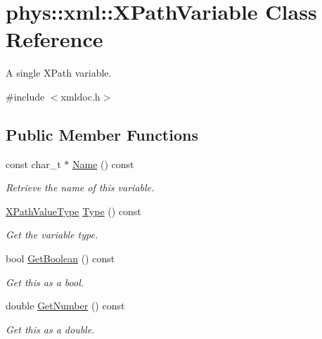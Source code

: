 \hypertarget{classphys_1_1xml_1_1XPathVariable}{
\section{phys::xml::XPathVariable Class Reference}
\label{df/dee/classphys_1_1xml_1_1XPathVariable}
}


A single XPath variable.  




{\ttfamily \#include $<$xmldoc.h$>$}

\subsection*{Public Member Functions}
\begin{DoxyCompactItemize}
\item 
const char\_\-t $\ast$ \hyperlink{classphys_1_1xml_1_1XPathVariable_af51c0a3362e130e30df85068ab95de63}{Name} () const 
\begin{DoxyCompactList}\small\item\em Retrieve the name of this variable. \item\end{DoxyCompactList}\item 
\hyperlink{namespacephys_1_1xml_a339b9eef674ba44100110e5524bc575d}{XPathValueType} \hyperlink{classphys_1_1xml_1_1XPathVariable_a6c2986292fe674b79ea9dbf261c4a96f}{Type} () const 
\begin{DoxyCompactList}\small\item\em Get the variable type. \item\end{DoxyCompactList}\item 
bool \hyperlink{classphys_1_1xml_1_1XPathVariable_ade5e5da86817afc6fafd64d4f9b21e9c}{GetBoolean} () const 
\begin{DoxyCompactList}\small\item\em Get this as a bool. \item\end{DoxyCompactList}\item 
double \hyperlink{classphys_1_1xml_1_1XPathVariable_ac3798fc142b781c48bd694f1cdd386c4}{GetNumber} () const 
\begin{DoxyCompactList}\small\item\em Get this as a double. \item\end{DoxyCompactList}\item 

\end{DoxyCompactItemize}

